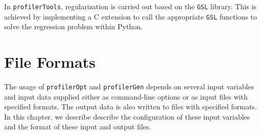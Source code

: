 \documentclass[10pt,a4paper,openany]{memoir}
\numberwithin{equation}{section}
\newcommand{\profileropt}[0]{\texttt{profilerOpt}}
\newcommand{\profilergen}[0]{\texttt{profilerGen}}
\newcommand{\profilertools}[0]{\texttt{profilerTools}}
\begin{document}
In \profilertools{}, regularization is carried out based on the
\texttt{GSL} library.  This is achieved by implementing a C extension
to call the appropriate \texttt{GSL} functions to solve the regression
problem within Python.

\chapter{File Formats}
\label{chap:file-formats}

The usage of \profileropt{} and \profilergen{} depends on several
input variables and input data supplied either as command-line options
or as input files with specified formats. The output data is also
written to files with specified formats. In this chapter, we describe
describe the configuration of these input variables and the format of
these input and output files.




\end{document}
